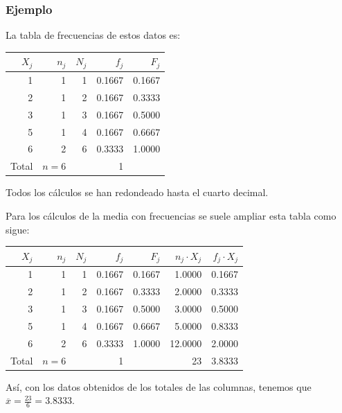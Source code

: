 \begin{frame}
\frametitle{Ejemplo}

 La tabla de frecuencias de estos datos es:


\begin{table}[ht]
\begin{center}
\begin{tabular}{rrrrr}
  \hline
$X_j$ & $n_j$ & $N_j$ & $f_j$ & $F_j$ \\ 
  \hline
  1 & 1 & 1 & 0.1667 & 0.1667 \\ 
  2 & 1 & 2 & 0.1667 & 0.3333 \\ 
  3 & 1 & 3 & 0.1667 & 0.5000 \\ 
  5 & 1 & 4 & 0.1667 & 0.6667 \\ 
  6 & 2 & 6 & 0.3333 & 1.0000 \\ 
   \hline
Total & $n=6$ & & 1 & \\\hline
\end{tabular}
\end{center}
\end{table}

Todos los cálculos se han redondeado hasta el cuarto decimal.
\end{frame}





\begin{frame}
Para los cálculos de la media con frecuencias se suele ampliar esta tabla como sigue:
\begin{table}[ht]
\begin{center}
\begin{tabular}{rrrrrrr}
  \hline
$X_j$ & $n_j$ & $N_j$ & $f_j$ & $F_j$ & $n_j\cdot X_j$ & $f_j\cdot X_j$ \\ 
  \hline
1 & 1 & 1 & 0.1667 & 0.1667 & 1.0000 & 0.1667 \\ 
  2 & 1 & 2 & 0.1667 & 0.3333 & 2.0000 & 0.3333 \\ 
  3 & 1 & 3 & 0.1667 & 0.5000 & 3.0000 & 0.5000 \\ 
  5 & 1 & 4 & 0.1667 & 0.6667 & 5.0000 & 0.8333 \\ 
  6 & 2 & 6 & 0.3333 & 1.0000 & 12.0000 & 2.0000 \\ 
   \hline
Total & $n=6$  &  & 1 & & 23 & 3.8333\\
\end{tabular}
\end{center}
\end{table}

Así, con los datos obtenidos de los totales de las columnas, tenemos que  $\overline{x}=\frac{23}{6}=3.8333$.
\end{frame}

